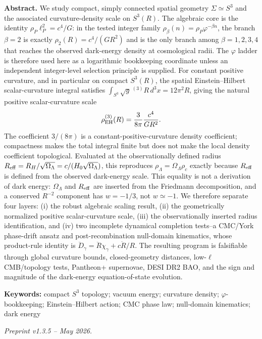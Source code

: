 \documentclass[11pt,a4paper]{article}
\newcommand{\vph}{\varphi}
\newcommand{\RH}{R_H}
\newcommand{\Reff}{R_{\rm eff}}
\newcommand{\OmL}{\Omega_\Lambda}
\begin{document}
\begin{titlepage}
\begin{center}
\vspace{0.8cm}
\begin{minipage}{0.88\textwidth}
\textbf{Abstract.}
We study compact, simply connected spatial geometry $\Sigma\simeq S^3$ and the
associated curvature-density scale on $S^3(R)$.  The algebraic core is the
identity $\rho_P\ell_P^2=c^4/G$: in the tested integer family
$\rho_\beta(n)=\rho_P\varphi^{-\beta n}$, the branch $\beta=2$ is exactly
$\rho_2(R)=c^4/(G R^2)$ and is the only branch among $\beta=1,2,3,4$ that reaches
the observed dark-energy density at cosmological radii.  The $\varphi$ ladder is
therefore used here as a logarithmic bookkeeping coordinate unless an independent
integer-level selection principle is supplied.  For constant positive curvature, and in particular on compact $S^3(R)$, the spatial
Einstein--Hilbert scalar-curvature integral satisfies
$\int_{S^3}\sqrt{g}\,{}^{(3)}R\,d^3x=12\pi^2R$, giving the natural positive
scalar-curvature scale
\[\rho_{\rm EH}^{(3)}(R)=\frac{3}{8\pi}\frac{c^4}{G R^2}.\]
The coefficient $3/(8\pi)$ is a constant-positive-curvature density coefficient;
compactness makes the total integral finite but does not make the local density
coefficient topological.  Evaluated at the observationally defined radius
$\Reff=\RH/\sqrt{\OmL}=c/(H_0\sqrt{\OmL})$, this reproduces
$\rho_\Lambda=\OmL\rho_c$ exactly because $\Reff$ is defined from the observed
dark-energy scale.  This equality is not a derivation of dark energy: $\OmL$ and
$\Reff$ are inserted from the Friedmann decomposition, and a conserved $R^{-2}$
component has $w=-1/3$, not $w\simeq-1$.  We therefore separate four layers: (i) the robust algebraic scaling
result, (ii) the geometrically normalized positive scalar-curvature scale,
(iii) the observationally inserted radius identification, and (iv) two incomplete
dynamical completion tests--a CMC/York phase-drift ansatz and post-recombination
null-domain kinematics, whose product-rule identity is
$\ddot D_\gamma=\ddot R\chi_\gamma+c\dot R/R$.  The resulting program is
falsifiable through global
curvature bounds, closed-geometry distances, low-$\ell$ CMB/topology tests,
Pantheon+ supernovae, DESI DR2 BAO, and the sign and magnitude of the
dark-energy equation-of-state evolution.
\end{minipage}

\vspace{0.7cm}
\textbf{Keywords:} compact $S^3$ topology; vacuum energy; curvature density;
$\vph$-bookkeeping; Einstein--Hilbert action; CMC phase law; null-domain kinematics;
dark energy

\vspace{0.5cm}
\textit{Preprint v1.3.5 -- May 2026.}
\end{center}
\end{titlepage}
\end{document}
